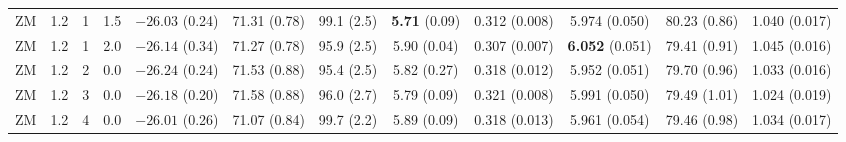 \documentclass[aip,jcp,a4paper,preprint,unsortedaddress,onecolumn,fleqn]{revtex4-1}
\begin{document}
\begin{sidewaystable}
\begin{tabular*}{0.99\textwidth}{@{\extracolsep{\fill}}cccc cccccccc}
    ZM          &1.2 & 1  &1.5 & $-26.03$ (0.24) & 71.31 (0.78)  & 99.1 (2.5)          & \textbf{5.71} (0.09)&        {0.312} (0.008)& 5.974 (0.050)               &80.23 (0.86)           &1.040 (0.017)          \\ 
    ZM          &1.2 & 1  &2.0 & $-26.14$ (0.34) & 71.27 (0.78)  & 95.9 (2.5)          &        {5.90} (0.04)&        {0.307} (0.007)& \textbf{6.052} (0.051)      &79.41 (0.91)           &1.045 (0.016)          \\\hline
    ZM          &1.2 & 2  &0.0 & $-26.24$ (0.24) & 71.53 (0.88)  & 95.4 (2.5)          & 5.82 (0.27)         & 0.318 (0.012)         & 5.952 (0.051)               &79.70 (0.96)           &1.033 (0.016)          \\
    ZM          &1.2 & 3  &0.0 & $-26.18$ (0.20) & 71.58 (0.88)  & 96.0 (2.7)          & 5.79 (0.09)         & 0.321 (0.008)         & 5.991 (0.050)               &79.49 (1.01)           &1.024 (0.019)          \\
    ZM          &1.2 & 4  &0.0 & $-26.01$ (0.26) & 71.07 (0.84)  & 99.7 (2.2)          & 5.89 (0.09)         & 0.318 (0.013)         & 5.961 (0.054)               &79.46 (0.98)           &1.034 (0.017)          \\
    \hline\hline
  \end{tabular*}
  \label{tab:tmp3}
\end{sidewaystable}
\end{document}
